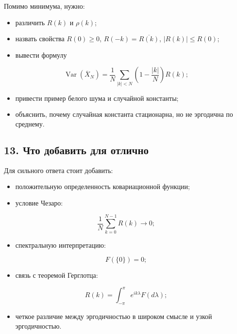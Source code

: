 \documentclass[
  11pt,
  a4paper,
]{article}
\providecommand{\tightlist}{%
  \setlength{\itemsep}{0pt}\setlength{\parskip}{0pt}}
\begin{document}
Помимо минимума, нужно:

\begin{itemize}
\tightlist
\item
  различить \(R(k)\) и \(\rho(k)\);
\item
  назвать свойства \(R(0)\ge0\), \(R(-k)=\overline{R(k)}\),
  \(|R(k)|\le R(0)\);
\item
  вывести формулу
\end{itemize}

\[
\operatorname{Var}(\overline X_N)
=
\frac1N\sum_{|k|<N}\left(1-\frac{|k|}{N}\right)R(k);
\]

\begin{itemize}
\tightlist
\item
  привести пример белого шума и случайной константы;
\item
  объяснить, почему случайная константа стационарна, но не эргодична по
  среднему.
\end{itemize}

\subsection{13. Что добавить для
отлично}\label{ux447ux442ux43e-ux434ux43eux431ux430ux432ux438ux442ux44c-ux434ux43bux44f-ux43eux442ux43bux438ux447ux43dux43e}

Для сильного ответа стоит добавить:

\begin{itemize}
\tightlist
\item
  положительную определенность ковариационной функции;
\item
  условие Чезаро:
\end{itemize}

\[
\frac1N\sum_{k=0}^{N-1}R(k)\to0;
\]

\begin{itemize}
\tightlist
\item
  спектральную интерпретацию:
\end{itemize}

\[
F(\{0\})=0;
\]

\begin{itemize}
\tightlist
\item
  связь с теоремой Герглотца:
\end{itemize}

\[
R(k)=\int_{-\pi}^{\pi}e^{ik\lambda}F(d\lambda);
\]

\begin{itemize}
\tightlist
\item
  четкое различие между эргодичностью в широком смысле и узкой
  эргодичностью.
\end{itemize}
\end{document}
